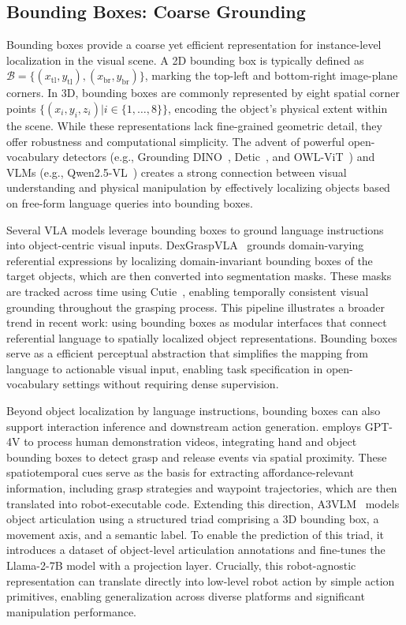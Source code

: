 \documentclass[10pt, a4paper, logo, copyright]{googledeepmind} %
\begin{document}
\subsection{Bounding Boxes: Coarse Grounding}
Bounding boxes provide a coarse yet efficient representation for instance-level localization in the visual scene. A 2D bounding box is typically defined as $\mathcal{B} = \{({x}_\mathrm{tl}, {y}_\mathrm{tl}), ({x}_\mathrm{br}, {y}_\mathrm{br})\}$, marking the top-left and bottom-right image-plane corners. In 3D, bounding boxes are commonly represented by eight spatial corner points $\{(x_i, y_i, z_i) | i \in \{1, \ldots, 8\} \}$, encoding the object’s physical extent within the scene. While these representations lack fine-grained geometric detail, they offer robustness and computational simplicity. The advent of powerful open-vocabulary detectors (e.g., Grounding DINO~\cite{LiuZRLZYJLYSZZ24}, Detic~\cite{ZhouGJKM22}, and OWL-ViT~\cite{minderer2022simple}) and VLMs (e.g., Qwen2.5-VL~\cite{bai2025qwen2}) creates a strong connection between visual understanding and physical manipulation by effectively localizing objects based on free-form language queries into bounding boxes.

Several VLA models leverage bounding boxes to ground language instructions into object-centric visual inputs. DexGraspVLA~\cite{zhong2025dexgraspvla} grounds domain-varying referential expressions by localizing domain-invariant bounding boxes of the target objects, which are then converted into segmentation masks. These masks are tracked across time using Cutie~\cite{cheng2024putting}, enabling temporally consistent visual grounding throughout the grasping process. This pipeline illustrates a broader trend in recent work: using bounding boxes as modular interfaces that connect referential language to spatially localized object representations. Bounding boxes serve as a efficient perceptual abstraction that simplifies the mapping from language to actionable visual input, enabling task specification in open-vocabulary settings without requiring dense supervision.

Beyond object localization by language instructions, bounding boxes can also support interaction inference and downstream action generation. \citet{wake2024gpt} employs GPT-4V to process human demonstration videos, integrating hand and object bounding boxes to detect grasp and release events via spatial proximity. These spatiotemporal cues serve as the basis for extracting affordance-relevant information, including grasp strategies and waypoint trajectories, which are then translated into robot-executable code. Extending this direction, A3VLM~\cite{huanga3vlm} models object articulation using a structured triad comprising a 3D bounding box, a movement axis, and a semantic label. To enable the prediction of this triad, it introduces a dataset of object-level articulation annotations and fine-tunes the Llama-2-7B model with a projection layer. Crucially, this robot-agnostic representation can translate directly into low-level robot action by simple action primitives, enabling generalization across diverse platforms and significant manipulation performance.
\end{document}
